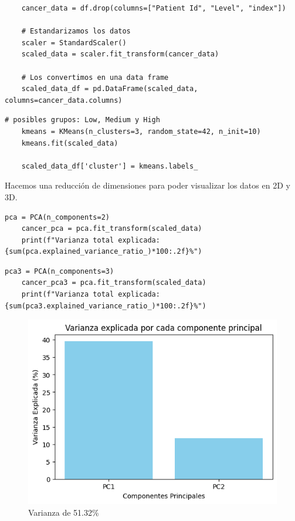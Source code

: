 		
\begin{lstlisting}
    cancer_data = df.drop(columns=["Patient Id", "Level", "index"])

    # Estandarizamos los datos 
    scaler = StandardScaler()
    scaled_data = scaler.fit_transform(cancer_data)

    # Los convertimos en una data frame
    scaled_data_df = pd.DataFrame(scaled_data, columns=cancer_data.columns)
\end{lstlisting}

\begin{lstlisting}[caption={Código de k-means}]
    # posibles grupos: Low, Medium y High
    kmeans = KMeans(n_clusters=3, random_state=42, n_init=10)
    kmeans.fit(scaled_data)

    scaled_data_df['cluster'] = kmeans.labels_
\end{lstlisting}

Hacemos una reducción de dimensiones para poder visualizar los datos en 2D y 3D.  

\begin{lstlisting}[caption={PCA para 2D}]
    pca = PCA(n_components=2)
    cancer_pca = pca.fit_transform(scaled_data)
    print(f"Varianza total explicada: {sum(pca.explained_variance_ratio_)*100:.2f}%")
\end{lstlisting}

\begin{lstlisting}[caption={PCA para 3D}]
    pca3 = PCA(n_components=3)
    cancer_pca3 = pca.fit_transform(scaled_data)
    print(f"Varianza total explicada: {sum(pca3.explained_variance_ratio_)*100:.2f}%")
\end{lstlisting}

\begin{figure}[!ht]
    \centering
    \includegraphics[scale = 0.75]{Enrique/Imagenes/Varianza_2d.png}
    \caption{Varianza de 51.32\%}
\end{figure}

